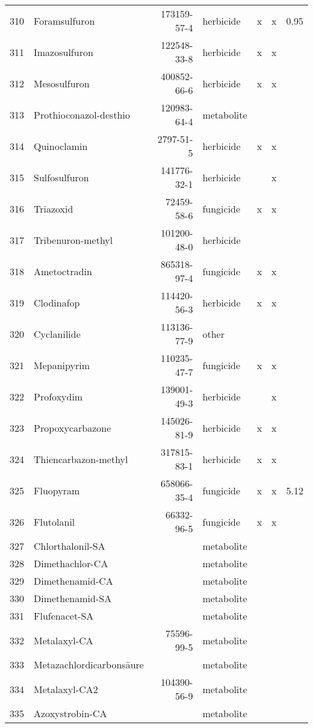 \begin{longtable}{lp{3cm}rlp{0.5cm}p{0.5cm}p{1cm}}
  310 & Foramsulfuron & 173159-57-4 & herbicide & x & x & 0.95 \\ 
  311 & Imazosulfuron & 122548-33-8 & herbicide & x & x &  \\ 
  312 & Mesosulfuron & 400852-66-6 & herbicide & x & x &  \\ 
  313 & Prothioconazol-desthio & 120983-64-4 & metabolite &  &  &  \\ 
  314 & Quinoclamin & 2797-51-5 & herbicide & x & x &  \\ 
  315 & Sulfosulfuron & 141776-32-1 & herbicide &  & x &  \\ 
  316 & Triazoxid & 72459-58-6 & fungicide & x & x &  \\ 
  317 & Tribenuron-methyl & 101200-48-0 & herbicide &  &  &  \\ 
  318 & Ametoctradin & 865318-97-4 & fungicide & x & x &  \\ 
  319 & Clodinafop & 114420-56-3 & herbicide & x & x &  \\ 
  320 & Cyclanilide & 113136-77-9 & other &  &  &  \\ 
  321 & Mepanipyrim & 110235-47-7 & fungicide & x & x &  \\ 
  322 & Profoxydim & 139001-49-3 & herbicide &  & x &  \\ 
  323 & Propoxycarbazone & 145026-81-9 & herbicide & x & x &  \\ 
  324 & Thiencarbazon-methyl & 317815-83-1 & herbicide & x & x &  \\ 
  325 & Fluopyram & 658066-35-4 & fungicide & x & x & 5.12 \\ 
  326 & Flutolanil & 66332-96-5 & fungicide & x & x &  \\ 
  327 & Chlorthalonil-SA &  & metabolite &  &  &  \\ 
  328 & Dimethachlor-CA &  & metabolite &  &  &  \\ 
  329 & Dimethenamid-CA &  & metabolite &  &  &  \\ 
  330 & Dimethenamid-SA &  & metabolite &  &  &  \\ 
  331 & Flufenacet-SA &  & metabolite &  &  &  \\ 
  332 & Metalaxyl-CA & 75596-99-5 & metabolite &  &  &  \\ 
  333 & Metazachlordicarbonsäure &  & metabolite &  &  &  \\ 
  334 & Metalaxyl-CA2 & 104390-56-9 & metabolite &  &  &  \\ 
  335 & Azoxystrobin-CA &  & metabolite &  &  &  \\ 

\end{longtable}
